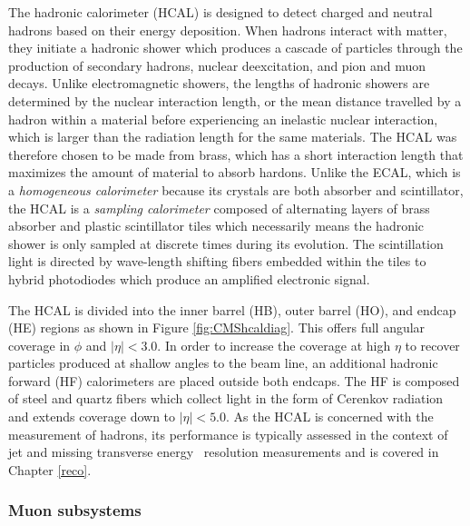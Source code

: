 The hadronic calorimeter (HCAL) is designed to detect charged and neutral hadrons based on their energy deposition. When hadrons interact with matter, they initiate a hadronic shower which produces a cascade of particles through the production of secondary hadrons, nuclear deexcitation, and pion and muon decays. Unlike electromagnetic showers, the lengths of hadronic showers are determined by the nuclear interaction length, or the mean distance travelled by a hadron within a material before experiencing an inelastic nuclear interaction, which is larger than the radiation length for the same materials. The HCAL was therefore chosen to be made from brass, which has a short interaction length that maximizes the amount of material to absorb hardons. Unlike the ECAL, which is a \textit{homogeneous calorimeter} because its crystals are both absorber and scintillator, the HCAL is a \textit{sampling calorimeter} composed of alternating layers of brass absorber and plastic scintillator tiles which necessarily means the hadronic shower is only sampled at discrete times during its evolution. The scintillation light is directed by wave-length shifting fibers embedded within the tiles to hybrid photodiodes which produce an amplified electronic signal.

The HCAL is divided into the inner barrel (HB), outer barrel (HO), and endcap (HE) regions as shown in Figure \ref{fig:CMShcaldiag}. This offers full angular coverage in $\phi$ and $\left| \eta \right| < 3.0$. In order to increase the coverage at high $\eta$ to recover particles produced at shallow angles to the beam line, an additional hadronic forward (HF) calorimeters are placed outside both endcaps. The HF is composed of steel and quartz fibers which collect light in the form of Cerenkov radiation and extends coverage down to $\left| \eta \right| < 5.0$. As the HCAL is concerned with the measurement of hadrons, its performance is typically assessed in the context of jet and missing transverse energy \pTmiss\ resolution measurements and is covered in Chapter \ref{reco}.

\subsubsection{Muon subsystems}

